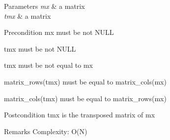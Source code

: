 \begin{DoxyParams}{Parameters}
{\em mx} & a matrix \\
\hline
{\em tmx} & a matrix\\
\hline
\end{DoxyParams}
\begin{DoxyPrecond}{Precondition}
{\ttfamily mx} must be not N\+U\+LL 

{\ttfamily tmx} must be not N\+U\+LL 

{\ttfamily tmx} must be not equal to {\ttfamily mx} 

{\ttfamily matrix\+\_\+rows(tmx)} must be equal to {\ttfamily matrix\+\_\+cols(mx)} 

{\ttfamily matrix\+\_\+cols(tmx)} must be equal to {\ttfamily matrix\+\_\+rows(mx)}
\end{DoxyPrecond}
\begin{DoxyPostcond}{Postcondition}
{\ttfamily tmx} is the transposed matrix of {\ttfamily mx}
\end{DoxyPostcond}
\begin{DoxyRemark}{Remarks}
Complexity\+: O(\+N) 
\end{DoxyRemark}
